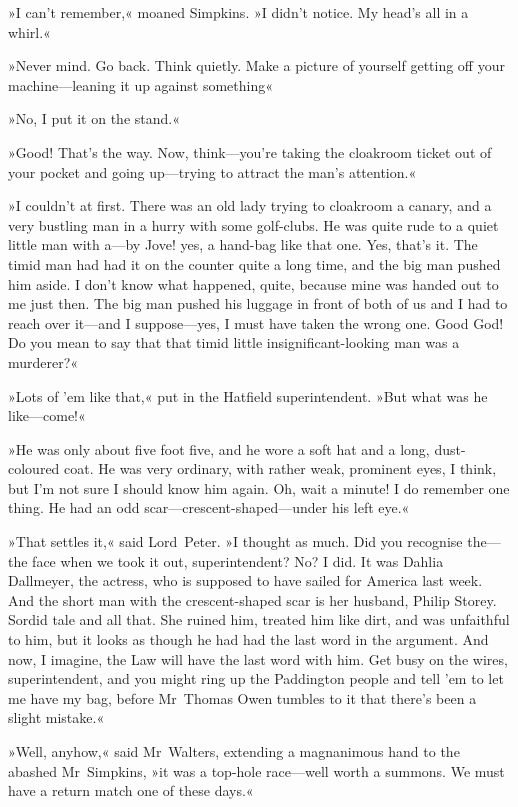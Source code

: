 »I can't remember,« moaned Simpkins. »I didn't notice. My head's all in a whirl.«

»Never mind. Go back. Think quietly. Make a picture of yourself getting off your machine—leaning it up against something\longdash«

»No, I put it on the stand.«

»Good! That's the way. Now, think—you're taking the cloakroom ticket out of your pocket and going up—trying to attract the man's attention.«

»I couldn't at first. There was an old lady trying to cloakroom a canary, and a very bustling man in a hurry with some golf-clubs. He was quite rude to a quiet little man with a—by Jove! yes, a hand-bag like that one. Yes, that's it. The timid man had had it on the counter quite a long time, and the big man pushed him aside. I don't know what happened, quite, because mine was handed out to me just then. The big man pushed his luggage in front of both of us and I had to reach over it—and I suppose—yes, I must have taken the wrong one. Good God! Do you mean to say that that timid little insignificant-looking man was a murderer?«

»Lots of 'em like that,« put in the Hatfield superintendent. »But what was he like—come!«

»He was only about five foot five, and he wore a soft hat and a long, dust-coloured coat. He was very ordinary, with rather weak, prominent eyes, I think, but I'm not sure I should know him again. Oh, wait a minute! I do remember one thing. He had an odd scar—crescent-shaped—under his left eye.«

»That settles it,« said Lord~Peter. »I thought as much. Did you recognise the—the face when we took it out, superintendent? No? I did. It was Dahlia Dallmeyer, the actress, who is supposed to have sailed for America last week. And the short man with the crescent-shaped scar is her husband, Philip Storey. Sordid tale and all that. She ruined him, treated him like dirt, and was unfaithful to him, but it looks as though he had had the last word in the argument. And now, I imagine, the Law will have the last word with him. Get busy on the wires, superintendent, and you might ring up the Paddington people and tell 'em to let me have my bag, before Mr~Thomas Owen tumbles to it that there's been a slight mistake.«

»Well, anyhow,« said Mr~Walters, extending a magnanimous hand to the abashed Mr~Simpkins, »it was a top-hole race—well worth a summons. We must have a return match one of these days.«


